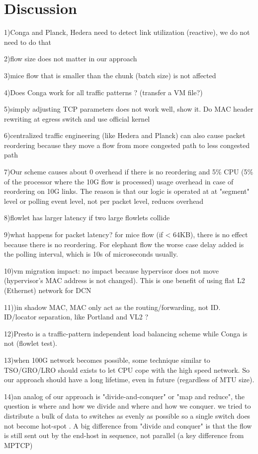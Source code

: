\section{Discussion}
\label{sec:discussion}

1)Conga and Planck, Hedera need to detect link utilization (reactive), we do not need to do that

2)flow size does not matter in our approach 

3)mice flow that is smaller than the chunk (batch size) is not affected 

4)Does Conga work for all traffic patterns ? (transfer a VM file?)

5)simply adjusting TCP parameters does not work well, show it. Do MAC header rewriting at egress switch and use official kernel 

6)centralized traffic engineering (like Hedera and Planck) can also cause packet reordering because they move a flow from more congested path to less congested path

7)Our scheme causes about 0 overhead if there is no reordering and 5\% CPU (5\% of the processor where the 10G flow is processed)
usage overhead in case of reordering on 10G links.  The reason is that our logic is operated at at "segment" level or polling event level, not per packet level, reduces overhead

8)flowlet has larger latency if two large flowlets collide

9)what happens for packet latency? for mice flow (if < 64KB), there is no effect because there is no reordering. For elephant flow the worse case delay added is the polling interval, which is 10s of microseconds usually. 

10)vm migration impact: no impact because hypervisor does not move (hypervisor's MAC address is not changed).
This is one benefit of using flat L2 (Ethernet) network for DCN

11))in shadow MAC, MAC only act as the routing/forwarding, not ID. ID/locator separation, like Portland and VL2 ?

12)Presto is a traffic-pattern independent load balancing scheme while Conga is not (flowlet test).

13)when 100G network becomes possible, some technique similar to TSO/GRO/LRO should exists to let CPU cope with the high speed network. So our approach should have a long lifetime, even in future (regardless of MTU size).

14)an analog of our approach is "divide-and-conquer" or "map and reduce", the question is where and how we divide and where and how we conquer. we tried to distribute a bulk of data to switches as evenly as possible so a single switch does not become hot-spot . A big difference from "divide and conquer" is that the flow is still sent out by the end-host in sequence, not parallel (a key difference from MPTCP)

